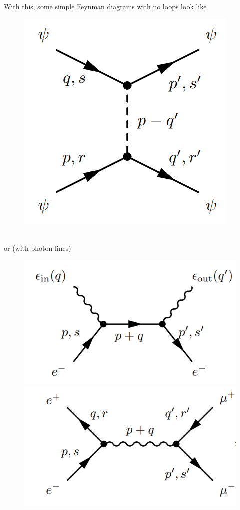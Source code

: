 \documentclass{book}
\theoremstyle{definition}
\begin{document}
With this, some simple Feynman diagrams with no loops look  like
\begin{figure}[!htb]
	\centering
	\includegraphics[scale=0.4]{fermi-diagram}
\end{figure}\\

or (with photon lines)
\begin{figure}[!htb]
	\centering
	\includegraphics[scale=0.4]{compton}
	\includegraphics[scale=0.4]{fermi-gen}
\end{figure}\\
\end{document}
